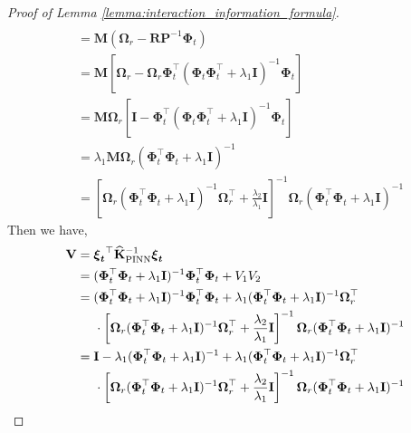 \begin{proof}[Proof of Lemma \ref{lemma:interaction_information_formula}]
\begin{align*}
\\
            & = \mathbf{M}(\boldsymbol{\Omega}_r - \mathbf{R}\mathbf{P}^{-1}\boldsymbol{\Phi}_t)
\\
            & = \mathbf{M}\left[\boldsymbol{\Omega}_r - \boldsymbol{\Omega}_r \boldsymbol{\Phi}_t^\top (\boldsymbol{\Phi}_t \boldsymbol{\Phi}_t^\top + \lambda_1\mathbf{I})^{-1}\boldsymbol{\Phi}_t\right] 
\\
            & = \mathbf{M}\boldsymbol{\Omega}_r \left[ \mathbf{I} - \boldsymbol{\Phi}_t^\top (\boldsymbol{\Phi}_t \boldsymbol{\Phi}_t^\top + \lambda_1\mathbf{I})^{-1}\boldsymbol{\Phi}_t\right]
\\
            & = \lambda_1 \mathbf{M} \boldsymbol{\Omega}_r (\boldsymbol{\Phi}_t^\top \boldsymbol{\Phi}_t + \lambda_1\mathbf{I})^{-1} 
\\ 
            & = \left[\boldsymbol{\Omega}_r(\boldsymbol{\Phi}_t^\top \boldsymbol{\Phi}_t+ \lambda_1\mathbf{I})^{-1}\boldsymbol{\Omega}_r^\top + \frac{\lambda_2} {\lambda_1} \mathbf{I}\right]^{-1} \boldsymbol{\Omega}_r (\boldsymbol{\Phi}_t^\top \boldsymbol{\Phi}_t + \lambda_1\mathbf{I})^{-1}
\end{align*}
Then we have, 
    \begin{align*}
            \mathbf{V} &= \boldsymbol{\boldsymbol{\xi}_t}^\top \mathbf{\widehat{K}}_\mathrm{PINN}^{-1} \boldsymbol{\boldsymbol{\xi}_t}  
            \\
            & = (\boldsymbol{\Phi}_t^\top\boldsymbol{\Phi}_t+\lambda_1 \mathbf{I})^{-1} \boldsymbol{\Phi}_t^\top\boldsymbol{\Phi}_t + V_1V_2
            \\
            & = (\boldsymbol{\Phi}_t^\top\boldsymbol{\Phi}_t+\lambda_1 \mathbf{I})^{-1} \boldsymbol{\Phi}_t^\top\boldsymbol{\Phi}_t + \lambda_1(\boldsymbol{\Phi}_t^\top\boldsymbol{\Phi}_t + \lambda_1\mathbf{I})^{-1} \boldsymbol{\Omega}_r^\top \notag \\
            &  \;\;\;\;\; \cdot \left[\boldsymbol{\Omega}_r(\boldsymbol{\Phi}_t^\top \boldsymbol{\Phi}_t+ \lambda_1\mathbf{I})^{-1}\boldsymbol{\Omega}_r^\top + \frac{\lambda_2} {\lambda_1} \mathbf{I}\right]^{-1} \boldsymbol{\Omega}_r (\boldsymbol{\Phi}_t^\top \boldsymbol{\Phi}_t + \lambda_1\mathbf{I})^{-1} 
            \\
            &= \mathbf{I} - \lambda_1(\boldsymbol{\Phi}_t^\top\boldsymbol{\Phi}_t+\lambda_1 \mathbf{I})^{-1} + \lambda_1(\boldsymbol{\Phi}_t^\top\boldsymbol{\Phi}_t + \lambda_1\mathbf{I})^{-1} \boldsymbol{\Omega}_r^\top \notag \\
            & \;\;\;\;\;   \cdot \left[\boldsymbol{\Omega}_r(\boldsymbol{\Phi}_t^\top \boldsymbol{\Phi}_t+ \lambda_1\mathbf{I})^{-1}\boldsymbol{\Omega}_r^\top + \frac{\lambda_2} {\lambda_1} \mathbf{I}\right]^{-1} \boldsymbol{\Omega}_r (\boldsymbol{\Phi}_t^\top \boldsymbol{\Phi}_t + \lambda_1\mathbf{I})^{-1} 

\end{align*}
\end{proof}
